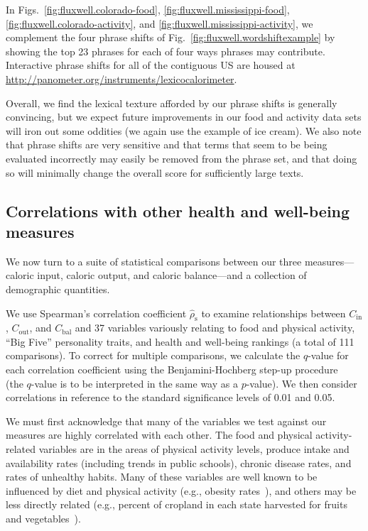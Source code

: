 \documentclass[10pt]{article}
\newcommand{\calin}{C_{\textrm{in}}}
\newcommand{\calout}{C_{\textrm{out}}}
\newcommand{\calbal}{C_{\textrm{bal}}}
\newcommand{\rhospearman}{\hat{\rho}_{\textrm{s}}}
\begin{document}
In Figs.~\ref{fig:fluxwell.colorado-food},
\ref{fig:fluxwell.mississippi-food},
\ref{fig:fluxwell.colorado-activity},
and
\ref{fig:fluxwell.mississippi-activity},
we complement the four phrase shifts
of Fig.~\ref{fig:fluxwell.wordshiftexample}
by showing the top 23 phrases for 
each of four ways phrases may contribute.
Interactive phrase shifts for all of the contiguous US are housed
at \url{http://panometer.org/instruments/lexicocalorimeter}.

Overall, we find the lexical texture afforded by our phrase shifts 
is generally convincing,
but we expect future improvements in our food and activity data sets
will iron out some oddities (we again use the example of ice cream).
We also note that phrase shifts are very sensitive and
that terms that seem to be being evaluated incorrectly
may easily be removed from the phrase set, and that
doing so will minimally change the overall score for
sufficiently large texts.

\subsection*{Correlations with other health and well-being measures}
\label{subsec:fluxwell.othermeasures}

We now turn to a suite of statistical comparisons
between our three measures---caloric input, caloric output,
and caloric balance---and a collection of demographic quantities.

We use Spearman's correlation coefficient $\rhospearman$ to examine relationships between 
$\calin$, $\calout$, and $\calbal$ and 37 variables
variously relating to food and physical activity, 
``Big Five'' personality traits,
and health and well-being rankings (a total of 111 comparisons).
To correct for multiple comparisons, we calculate the
$q$-value for each correlation coefficient using the
Benjamini-Hochberg step-up procedure~\cite{benjamini1995}
(the $q$-value is to be interpreted in the same way as a $p$-value).
We then consider correlations in reference
to the standard significance levels of 0.01 and 0.05.

We must first acknowledge that many of the variables we test 
against our measures are highly correlated with each other.
The food and physical activity-related variables are in the areas of
physical activity levels, produce intake and availability rates
(including trends in public schools), chronic disease rates, and rates
of unhealthy habits.  
Many of these variables are well known to be
influenced by diet and physical activity (e.g., obesity
rates~\cite{cdc}), 
and others may be less directly related (e.g., percent of
cropland in each state harvested for fruits and
vegetables~\cite{produce}).  
\end{document}
